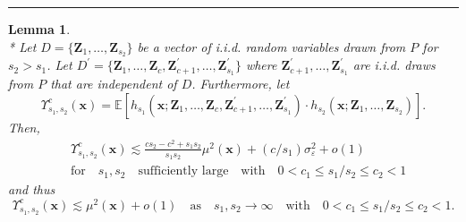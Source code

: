 \documentclass[letterpaper,10pt]{article}
\numberwithin{equation}{section}
\numberwithin{thm}{section}
\newtheorem{lem}{Lemma}
\numberwithin{lem}{section}
\numberwithin{cor}{section}
\newcommand{\E}{\mathbb{E}}
\newcommand{\1}{\mathbbm{1}}
\begin{document}
\hrule

\begin{lem}\label{lem:upsilon_sc}\mbox{}\\*
	Let $D = \{\mathbf{Z}_1, \dotsc, \mathbf{Z}_{s_2}\}$ be a vector of i.i.d. random variables drawn from $P$ for $s_2 > s_1$.
	Let $D^{\prime} = \{\mathbf{Z}_1, \dotsc, \mathbf{Z}_{c}, \mathbf{Z}_{c+1}^{\prime}, \dotsc,  \mathbf{Z}_{s_1}^{\prime}\}$ where $\mathbf{Z}_{c+1}^{\prime}, \dotsc,  \mathbf{Z}_{s_1}^{\prime}$ are i.i.d. draws from $P$ that are independent of $D$.
	Furthermore, let
	\begin{equation}
		\Upsilon_{s_1, s_2}^{c}\left(\mathbf{x}\right)
		= \E\left[h_{s_1}\left(\mathbf{x}; \mathbf{Z}_1, \ldots, \mathbf{Z}_c, \mathbf{Z}^{\prime}_{c+1}, \ldots,  \mathbf{Z}^{\prime}_{s_1}\right) \cdot
			h_{s_2}\left(\mathbf{x}; \mathbf{Z}_1, \ldots, \mathbf{Z}_{s_2}\right)\right].
	\end{equation}
	Then,
	\begin{equation}
		\begin{aligned}
			 & \Upsilon_{s_1, s_2}^{c}\left(\mathbf{x}\right)
			\lesssim \frac{c s_2 - c^2 + s_1 s_2}{s_1 s_2}\mu^2(\mathbf{x}) + (c/s_1) \sigma^2_{\varepsilon} + o(1) \\
			 & \text{for} \quad s_1, s_2 \quad \text{sufficiently large}
			\quad \text{with} \quad
			0 < c_1 \leq s_1 / s_2 \leq c_2 < 1
		\end{aligned}
	\end{equation}
	and thus
	\begin{equation}
		\Upsilon_{s_1, s_2}^{c}\left(\mathbf{x}\right)
		\lesssim \mu^2(\mathbf{x}) + o(1)
		\quad \text{as} \quad s_1, s_2 \rightarrow \infty
		\quad \text{with} \quad
		0 < c_1 \leq s_1 / s_2 \leq c_2 < 1.
	\end{equation}
\end{lem}
\end{document}
